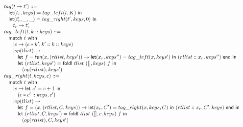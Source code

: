 \documentclass{article}[12pt,a4paper]
\theoremstyle{definition}
\begin{document}
\[
  \begin{array}{l}
    \begin{array}{l}
      tag(t\rightarrow t') ::=\\
      \hspace{2ex}\mathsf{let} (t_r, keys) = tag\_left(t, K)~\mathsf{in}\\
      \hspace{2ex}\mathsf{let} (t_r',\_,\_) = tag\_right(t', keys, 0)~\mathsf{in}\\
      \hspace{4ex}t_r \rightarrow t'_r
    \end{array}\\

  \begin{array}{l}
    tag\_left(t, k :: keys) ::=\\
    \hspace{2ex}\mathsf{match}~t~\mathsf{with}\\
    \hspace{4ex}| e \rightarrow (e*k',k'::k::keys)\\
    \hspace{4ex}| op(tlist) \rightarrow \\
    \hspace{6ex} \mathsf{let}~f=\mathsf{fun}(x,(rtlist, keys')) \rightarrow \mathsf{let}(x_r,keys'')=tag\_left(x, keys')~\mathsf{in}~(rtlist::x_r, keys'')~\mathsf{end}~\mathsf{in}\\
    \hspace{6ex} \mathsf{let}~(rtlist, keys') = \mathsf{foldl}~tlist~([],keys)~f~\mathsf{in}\\
    \hspace{8ex} (op(rtlist), keys')
  \end{array}\\

  \begin{array}{l}
    tag\_right(t, keys, c) ::=\\
    \hspace{2ex}\mathsf{match}~t~\mathsf{with}\\
    \hspace{4ex}| e \rightarrow \mathsf{let}~c'=c+1~\mathsf{in}\\
    \hspace{6ex} (e*c'::keys,c')\\
    \hspace{4ex}| op(tlist) \rightarrow \\
    \hspace{6ex} \mathsf{let}~f = (x,(rtlist,C,keys))\rightarrow \mathsf{let}(x_r,C')=tag\_right(x, keys, C)~\mathsf{in}~(rtlist::x_r,C', keys)~\mathsf{end}~\mathsf{in}\\
    \hspace{6ex} \mathsf{let}~(rtlist, C, keys') = \mathsf{foldl}~tlist~([],c,keys)~f~\mathsf{in}\\
    \hspace{8ex} (op(rtlist), C, keys')    
  \end{array}
  \end{array}
\]
\end{document}
